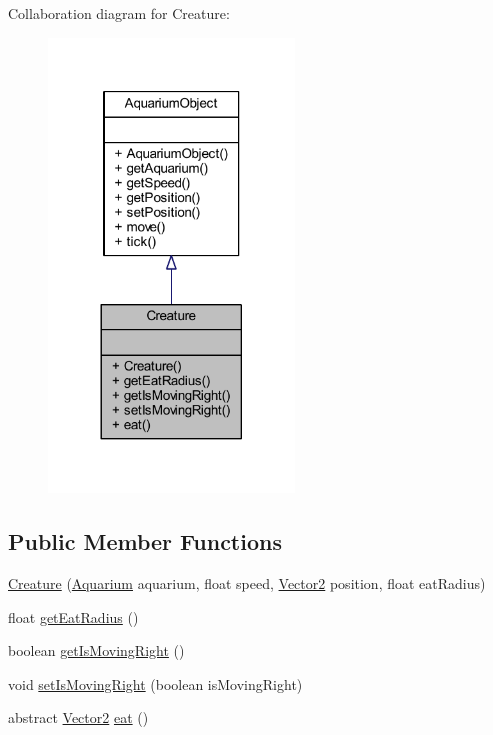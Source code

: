Collaboration diagram for Creature\+:
\nopagebreak
\begin{figure}[H]
\begin{center}
\leavevmode
\includegraphics[width=185pt]{class_creature__coll__graph}
\end{center}
\end{figure}
\subsection*{Public Member Functions}
\begin{DoxyCompactItemize}
\item 
\mbox{\hyperlink{class_creature_af3d99d9dee3ec509f4cfe57793659ac4}{Creature}} (\mbox{\hyperlink{class_aquarium}{Aquarium}} aquarium, float speed, \mbox{\hyperlink{class_vector2}{Vector2}} position, float eat\+Radius)
\item 
float \mbox{\hyperlink{class_creature_a081915b29b8deffca77eddbd4dc264ae}{get\+Eat\+Radius}} ()
\item 
boolean \mbox{\hyperlink{class_creature_aabe86755952b9468133db908895d2031}{get\+Is\+Moving\+Right}} ()
\item 
void \mbox{\hyperlink{class_creature_a36e69cbb4e68318fc9ef7ff08ff59ac1}{set\+Is\+Moving\+Right}} (boolean is\+Moving\+Right)
\item 
abstract \mbox{\hyperlink{class_vector2}{Vector2}} \mbox{\hyperlink{class_creature_a1917610814e5b4021622275175e58bf1}{eat}} ()
\end{DoxyCompactItemize}



